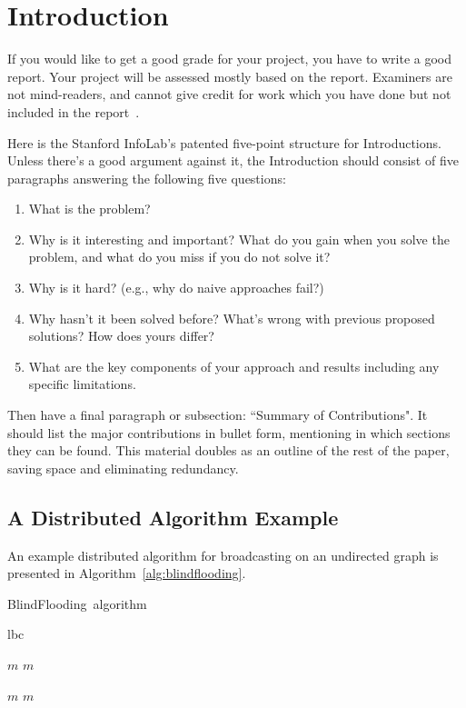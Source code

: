 \documentclass{winslabreport}
\begin{document}
\tableofcontents
\listoffigures
\listoftables
\body

\section{Introduction}

If you would like to get a good grade for your project, you have to write a good report.  Your project will be assessed mostly based on the report. Examiners are not mind-readers, and cannot give credit for work which you have done but not included in the report~\cite{York2017}.

Here is the Stanford InfoLab's patented five-point structure for Introductions. Unless there's a good argument against it, the Introduction should consist of five paragraphs answering the following five questions:
\begin{enumerate}
\item What is the problem?
\item Why is it interesting and important? What do you gain when you solve the problem, and what do you miss if you do not solve it?
\item Why is it hard? (e.g., why do naive approaches fail?)
\item Why hasn't it been solved before? What's wrong with previous proposed solutions? How does yours differ?
\item What are the key components of your approach and results including any specific limitations.
\end{enumerate}

Then have a final paragraph or subsection: ``Summary of Contributions". It should list the major contributions in bullet form, mentioning in which sections they can be found. This material doubles as an outline of the rest of the paper, saving space and eliminating redundancy.

\subsection{A Distributed Algorithm Example}

An example distributed algorithm for broadcasting on an undirected graph is presented in Algorithm~\ref{alg:blindflooding}.

\begin{algorithm}
	\def\algorithmlabel{BlindFlooding}
    \caption{\algorithmlabel\ algorithm}
    \label{alg:blindflooding}
    \begin{algorithmic}[1]
    	\Implement {\algorithmlabel}{cf} 
    	 {lbc} 
	\Need {}

        		
         { $m$ }
        		 { $m$  }
        		
         { $m$ }	
        		 { $m$  }
    \end{algorithmic}
\end{algorithm}
\end{document}

